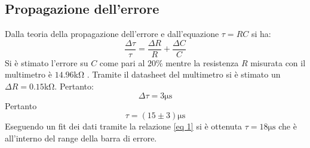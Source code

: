 \subsection{Propagazione dell'errore}
Dalla teoria della propagazione dell'errore e dall'equazione $\tau=RC$ si ha:
\begin{equation}
    \frac{\Delta\tau}{\tau}=\frac{\Delta R}{R}+\frac{\Delta C}{C}
\end{equation}
Si è stimato l'errore su $C$ come pari al $20\%$ mentre la resistenza $R$ misurata con il multimetro è $14.96$\unit{\kohm} . Tramite il datasheet del multimetro si è stimato un $\Delta R = 0.15 $\unit{\kohm}. Pertanto:
\begin{equation}
    \Delta \tau = 3\unit{\us}
\end{equation}
Pertanto 
\begin{equation*}
    \tau=(15\pm 3) \unit{\us}
\end{equation*}
Eseguendo un fit dei dati tramite la relazione \ref{eq 1} si è ottenuta $\tau=18\unit{\us}$ che è all'interno del range della barra di errore.
